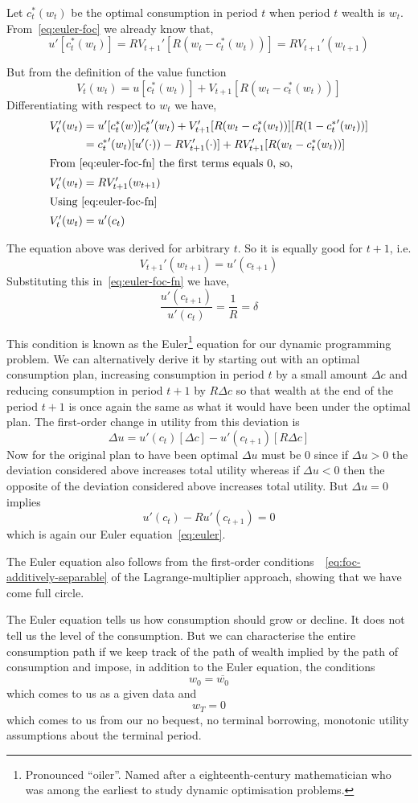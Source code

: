 \documentclass[12pt,reqno]{amsart}
\begin{document}
Let $c_t^*(w_t)$ be the optimal consumption in period $t$ when period
$t$ wealth is $w_t$. From~\eqref{eq:euler-foc} we already know that,
\begin{equation}\label{eq:euler-foc-fn}
u'[c_t^*(w_t)]=RV_{t+1}'[R(w_t-c_t^*(w_t))]=RV_{t+1}'(w_{t+1})
\end{equation}

\pagebreak

But from the definition of the value function
\[V_t(w_t) = u[c_t^*(w_t)]+V_{t+1}[R(w_t-c_t^*(w_t))]\]
Differentiating with respect to $w_t$ we have,
\begin{align*}
V_t'(w_t) &=
u'[c_t^*(w)]{c_t^*}'(w_t)
+V_{t+1}'[R(w_t-c_t^*(w_t))][R(1-{c_t^*}'(w_t))]\\
&={c_t^*}'(w_t)[u'(\cdot))-RV_{t+1}'(\cdot)]+RV_{t+1}'[R(w_t-c_t^*(w_t))]\\
\intertext{From \eqref{eq:euler-foc-fn} the first terms equals $0$,
  so,}
V_t'(w_t)&=RV_{t+1}'(w_{t+1})\\
\intertext{Using~\eqref{eq:euler-foc-fn}}
V_t'(w_t)&=u'(c_t)
\end{align*}

The equation above was derived for arbitrary $t$. So it is equally
good for $t+1$, i.e.
\[V_{t+1}'(w_{t+1})=u'(c_{t+1})\]
Substituting this in~\eqref{eq:euler-foc-fn} we have,
\begin{equation}\label{eq:euler}
\frac{u'(c_{t+1})}{u'(c_t)}=\frac{1}{R}=\delta
\end{equation}

This condition is known as the Euler\footnote{Pronounced
  ``oiler''. Named after a eighteenth-century mathematician who was
  among the earliest to study dynamic optimisation problems.} equation for our dynamic
programming problem. We can alternatively derive it by starting out
with an optimal consumption plan, increasing consumption in period $t$
by a small amount $\Delta c$ and reducing consumption in period
$t+1$ by $R\Delta c$ so that wealth at the end of the period
$t+1$ is once again the same as what it would have been under the
optimal plan. The first-order change in utility from this deviation is
\[\Delta u=u'(c_t)[\Delta c]-u'(c_{t+1})[R\Delta c]\]
Now for the original plan to have been optimal $\Delta u$ must be $0$
since if $\Delta u>0$ the deviation considered above increases total
utility whereas if $\Delta u<0$ then the opposite of the deviation
considered above increases total utility. But $\Delta u=0$ implies 
\[u'(c_t)-Ru'(c_{t+1})=0\]
which is again our Euler equation~\eqref{eq:euler}.

The Euler equation also follows from the first-order
conditions~~\eqref{eq:foc-additively-separable} of the Lagrange-multiplier
approach, showing that we have
come full circle.

The Euler equation tells us how consumption should grow or decline. It
does not tell us the level of the consumption. But we can characterise
the entire consumption path if we keep track of
the path of wealth implied by the path of consumption and impose, in
addition to the Euler equation, the
conditions
\[w_0 = \overline{w_0}\]
which comes to us as a given data and 
\[w_T=0\]
which comes to us from our no bequest, no terminal borrowing,
monotonic utility assumptions about the terminal period.
\end{document}
